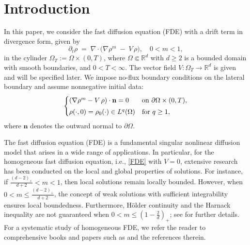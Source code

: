 \documentclass{amsart}
\numberwithin{equation}{section}
\begin{document}
\maketitle





\hypersetup{linkcolor=black}
\setcounter{tocdepth}{2}
\tableofcontents



\section{Introduction}

In this paper, we consider the fast diffusion equation (FDE) with a drift term in divergence form, given by
\begin{equation}\label{FDE}
  \partial_t \rho \;=\; \nabla \cdot\bigl(\nabla \rho^m \;-\; V\,\rho\bigr),
  \quad 0 < m < 1,
\end{equation}
in the cylinder \(\Omega_T := \Omega \times (0, T)\), where 
\(\Omega \Subset \mathbb{R}^d\) with \(d \ge 2\) is a bounded domain with smooth boundaries, and \(0 < T < \infty\). The vector field \(V : \Omega_T \to \mathbb{R}^d\) is given and will be specified later.
We impose no-flux boundary conditions on the lateral boundary and assume nonnegative initial data:
\begin{equation}\label{FDE_bc_ic}
\begin{cases}
(\nabla \rho^m - V\,\rho)\cdot \mathbf{n} = 0 
  &\text{on } \partial\Omega \times (0, T), \vspace{1mm} \\
\rho(\cdot, 0) = \rho_0(\cdot) \in L^q(\Omega)
  &\text{for } q \ge 1,
\end{cases}
\end{equation}
where \(\mathbf{n}\) denotes the outward normal to \(\partial\Omega\). 


The fast diffusion equation (FDE) is a fundamental singular nonlinear diffusion model that arises in a wide range of applications. In particular, for the homogeneous fast diffusion equation, i.e., \eqref{FDE} with \( V=0 \), extensive research has been conducted on the local and global properties of solutions.
For instance, if \( \frac{(d-2)_{+}}{d+2} < m < 1 \), then local solutions remain locally bounded. However, when \( 0 < m \leq \frac{(d-2)_{+}}{d+2} \), the concept of weak solutions with sufficient integrability ensures local boundedness. Furthermore, H\"{o}lder continuity and the Harnack inequality are not guaranteed when \( 0 < m \leq (1 - \frac{2}{d})_{+} \); see \cite{Chen_DiBenedetto, DiBenedetto_Kwong, DiBenedetto_Kwong_Vespri} for further details.
For a systematic study of homogeneous FDE, we refer the reader to comprehensive books and papers such as \cite{Vaz06, Vaz07, DGV12, BonFig2024, Bonforte_Vazquez_2006, Bonforte_Vazquez_2007} and the references therein.
\end{document}
